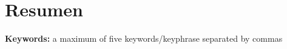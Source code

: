 \chapter*{Resumen}

\noindent %
\textbf{Keywords:} a maximum of five keywords/keyphrase separated by commas
